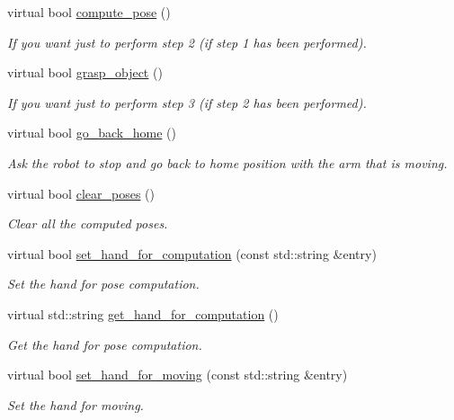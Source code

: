 \begin{DoxyCompactItemize}
virtual bool \hyperlink{classexperimentOne__IDL_a60389d324212814aa2dce49ed321e184}{compute\-\_\-pose} ()
\begin{DoxyCompactList}\small\item\em If you want just to perform step 2 (if step 1 has been performed). \end{DoxyCompactList}\item 
virtual bool \hyperlink{classexperimentOne__IDL_a2c72862f31d34a4e12adeb1e1289b5f0}{grasp\-\_\-object} ()
\begin{DoxyCompactList}\small\item\em If you want just to perform step 3 (if step 2 has been performed). \end{DoxyCompactList}\item 
virtual bool \hyperlink{classexperimentOne__IDL_a22c8d88117619d4e32ccc46efb455839}{go\-\_\-back\-\_\-home} ()
\begin{DoxyCompactList}\small\item\em Ask the robot to stop and go back to home position with the arm that is moving. \end{DoxyCompactList}\item 
virtual bool \hyperlink{classexperimentOne__IDL_a271373576b352956b3d7b2c111db3e40}{clear\-\_\-poses} ()
\begin{DoxyCompactList}\small\item\em Clear all the computed poses. \end{DoxyCompactList}\item 
virtual bool \hyperlink{classexperimentOne__IDL_acb2bfe937ed1900166744fce3a8f4cab}{set\-\_\-hand\-\_\-for\-\_\-computation} (const std\-::string \&entry)
\begin{DoxyCompactList}\small\item\em Set the hand for pose computation. \end{DoxyCompactList}\item 
virtual std\-::string \hyperlink{classexperimentOne__IDL_a93141c9f92c9c7a17518c3ddafda1fa4}{get\-\_\-hand\-\_\-for\-\_\-computation} ()
\begin{DoxyCompactList}\small\item\em Get the hand for pose computation. \end{DoxyCompactList}\item 
virtual bool \hyperlink{classexperimentOne__IDL_a0422e6ffaef0e60e1a557a342aeb5d4a}{set\-\_\-hand\-\_\-for\-\_\-moving} (const std\-::string \&entry)
\begin{DoxyCompactList}\small\item\em Set the hand for moving. \end{DoxyCompactList}\item 

\end{DoxyCompactItemize}

